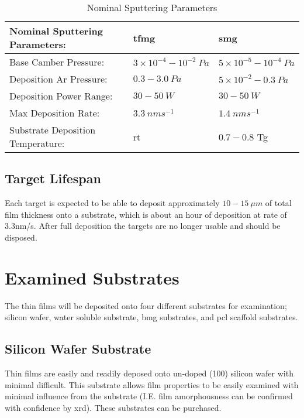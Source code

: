 \documentclass[a4paper,12pt,oneside]{report}%
\begin{document}
\begin{table}[h]
	\centering
	\begin{tabular}{ l l l }
		\toprule
		Nominal Sputtering Parameters: & \acrshort{tfmg} & \acrshort{smg} \\
		\midrule
		Base Camber Pressure: & $3 \times 10^{-4} - 10^{-2}~ Pa$ & $5 \times 10^{-5} - 10^{-4}~ Pa$ \\
		Deposition Ar Pressure:	& $0.3 - 3.0~ Pa$ & $5\times 10^{-2} - 0.3~ Pa$\\
		Deposition Power Range:	& $30 - 50~ W$ & $30 - 50~ W$\\
		Max Deposition Rate: & $3.3~ nm s^{-1}$ & $1.4~ nm s^{-1}$ \\	 
		Substrate Deposition Temperature: & \acrshort{rt} & $0.7 - 0.8$ \acrshort{Tg} \\
		\bottomrule
	\end{tabular}
	\caption{Nominal Sputtering Parameters}
	\label{tab:NomSputterParameters}
\end{table}  	

\subsection{Target Lifespan}
Each target is expected to be able to deposit approximately $10 - 15~ \mu m$ of total film thickness onto a substrate, which is about an hour of deposition at rate of 3.3nm/s. After full deposition the targets are no longer usable and should be disposed. 

\section{Examined Substrates} 
The thin films will be deposited onto four different substrates for examination; silicon wafer, water soluble substrate, \gls{bmg} substrates, and \gls{pcl} scaffold substrates.

\subsection{Silicon Wafer Substrate}
Thin films are easily and readily deposed onto un-doped (100) silicon wafer with minimal difficult. This substrate allows film properties to be easily examined with minimal influence from the substrate (I.E. film amorphousness can be confirmed with confidence by \acrshort{xrd}). These substrates can be purchased. 
\end{document}
